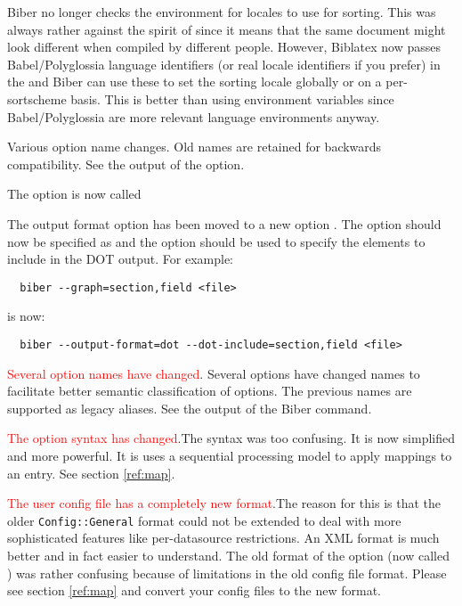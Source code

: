 \documentclass{ltxdockit}
\newcommand*{\biber}{Biber\xspace}
\newcommand*{\biblatex}{Biblatex\xspace}
\begin{document}
\biber no longer checks the environment for locales to use for sorting. This
was always rather against the spirit of \tex since it means that the same
document might look different when compiled by different people. However,
\biblatex now passes Babel/Polyglossia language identifiers (or real locale
identifiers if you prefer) in the  and \biber can use these to
set the sorting locale globally or on a per-sortscheme basis. This is better
than using environment variables since Babel/Polyglossia are more \latex
relevant language environments anyway.

Various option name changes. Old names are retained for backwards
compatibility. See the output of the  option.

The  option is now called 

The output format option  has been moved to a
new option . The option  should now be
specified as  and the \linebreak{} option
should be used to specify the elements to include in the DOT output. For
example:

\begin{verbatim}
  biber --graph=section,field <file>
\end{verbatim}

\noindent is now:

\begin{verbatim}
  biber --output-format=dot --dot-include=section,field <file>
\end{verbatim}

\textcolor{red}{Several option names have changed}. Several options have
changed names to facilitate better semantic classification of options. The
previous names are supported as legacy aliases. See the 
output of the \biber command.

\textcolor{red}{The  option syntax has changed}.The syntax
was too confusing. It is now simplified and more powerful. It is uses a
sequential processing model to apply mappings to an entry. See section
\ref{ref:map}.

\textcolor{red}{The user config file has a completely new format}.The
  reason for this is that the older \verb+Config::General+ format
  could not be extended to deal with more sophisticated features like
  per-datasource restrictions. An XML format is much better and in
  fact easier to understand. The old format of the  option
  (now called ) was rather confusing because
  of limitations in the old config file format. Please see section
  \ref{ref:map} and convert your config files to the new format.
\end{document}
